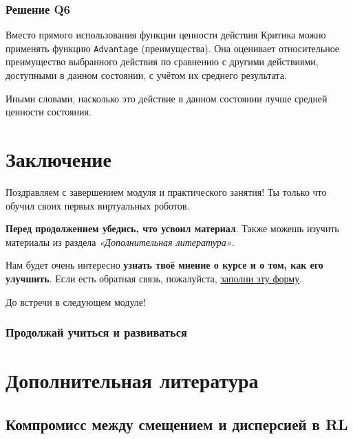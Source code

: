 \documentclass[11pt,a4paper]{article}
\begin{document}
\subsubsection{Решение Q6}\label{q6-solution}

Вместо прямого использования функции ценности действия Критика можно применять функцию \texttt{Advantage} (преимущества). Она оценивает относительное преимущество выбранного действия по сравнению с другими действиями, доступными в данном состоянии, с учётом их среднего результата.

Иными словами, насколько это действие в данном состоянии лучше средней ценности состояния.


\section{Заключение}\label{conclusion}

Поздравляем с завершением модуля и практического занятия! Ты только что обучил своих первых виртуальных роботов.

\textbf{Перед продолжением убедись, что усвоил материал}. Также можешь изучить материалы из раздела \emph{«Дополнительная литература»}.

Нам будет очень интересно \textbf{узнать твоё мнение о курсе и о том, как его улучшить}. Если есть обратная связь, пожалуйста, \href{https://forms.gle/BzKXWzLAGZESGNaE9}{заполни эту форму}.

До встречи в следующем модуле!

\subsubsection{Продолжай учиться и развиваться}\label{keep-learning-stay-awesome-1}

\section{Дополнительная литература}\label{additional-readings}

\subsection{Компромисс между смещением и дисперсией в RL}\label{bias-variance-tradeoff-in-reinforcement-learning}
\end{document}
